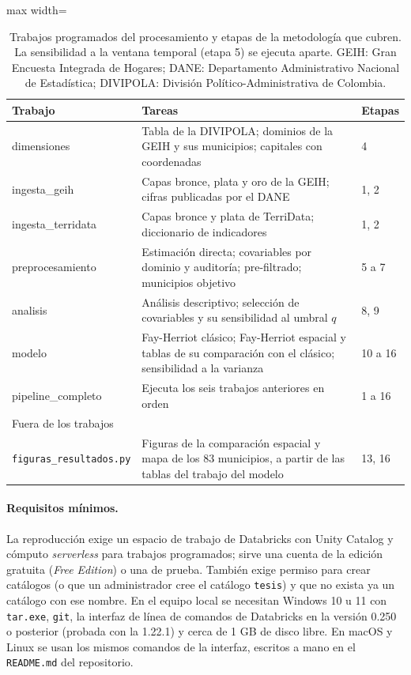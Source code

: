 \begin{table}[!htbp]
\centering
\small
\caption[Trabajos programados del procesamiento]{Trabajos programados del procesamiento y etapas de la metodología que cubren. La sensibilidad a la ventana temporal (etapa 5) se ejecuta aparte. GEIH: Gran Encuesta Integrada de Hogares; DANE: Departamento Administrativo Nacional de Estadística; DIVIPOLA: División Político-Administrativa de Colombia.}
\label{tab:app_jobs}
\begin{adjustbox}{max width=\linewidth}
\begin{tabular}{l p{8.6cm} l}
\toprule
Trabajo & Tareas & Etapas \\
\midrule
dimensiones & Tabla de la DIVIPOLA; dominios de la GEIH y sus municipios; capitales con coordenadas & 4 \\
ingesta\_geih & Capas bronce, plata y oro de la GEIH; cifras publicadas por el DANE & 1, 2 \\
ingesta\_terridata & Capas bronce y plata de TerriData; diccionario de indicadores & 1, 2 \\
preprocesamiento & Estimación directa; covariables por dominio y auditoría; pre-filtrado; municipios objetivo & 5 a 7 \\
analisis & Análisis descriptivo; selección de covariables y su sensibilidad al umbral $q$ & 8, 9 \\
modelo & Fay-Herriot clásico; Fay-Herriot espacial y tablas de su comparación con el clásico; sensibilidad a la varianza & 10 a 16 \\
pipeline\_completo & Ejecuta los seis trabajos anteriores en orden & 1 a 16 \\
\midrule
\multicolumn{3}{l}{Fuera de los trabajos} \\
\texttt{figuras\_resultados.py} & Figuras de la comparación espacial y mapa de los 83 municipios, a partir de las tablas del trabajo del modelo & 13, 16 \\
\bottomrule
\end{tabular}
\end{adjustbox}
\end{table}

\paragraph{Requisitos mínimos.} La reproducción exige un espacio de trabajo de Databricks con Unity Catalog y cómputo \textit{serverless} para trabajos programados; sirve una cuenta de la edición gratuita (\textit{Free Edition}) o una de prueba. También exige permiso para crear catálogos (o que un administrador cree el catálogo \texttt{tesis}) y que no exista ya un catálogo con ese nombre. En el equipo local se necesitan Windows 10 u 11 con \texttt{tar.exe}, \texttt{git}, la interfaz de línea de comandos de Databricks en la versión 0.250 o posterior (probada con la 1.22.1) y cerca de 1 GB de disco libre. En macOS y Linux se usan los mismos comandos de la interfaz, escritos a mano en el \texttt{README.md} del repositorio.

